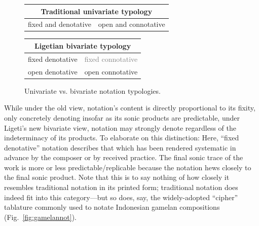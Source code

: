 \begin{figure}
    \centering
            \begin{tabular}{ |c|c| }
             \hline
             \multicolumn{2}{|c|}{\textbf{Traditional univariate typology}} \\
             \hline
             fixed and denotative & open and connotative  \\ 
             \hline
            \end{tabular}

                \vspace{10pt}

            \begin{tabular}{ |c|c| }
             \hline
             \multicolumn{2}{|c|}{\textbf{Ligetian bivariate typology}} \\
             \hline
             fixed denotative & \textcolor{gray}{fixed connotative\footnotemark}  \\ 
             \hline
             open denotative & open connotative  \\     
             \hline
            \end{tabular}
    \caption{Univariate vs. bivariate notation typologies.}
        \label{fig:typologies}
    \end{figure}

    While under the old view, notation's content is directly proportional to its fixity, only concretely denoting insofar as its sonic products are predictable, under Ligeti's new bivariate view, notation may strongly denote regardless of the indeterminacy of its products. To elaborate on this distinction: Here, ``fixed denotative'' notation describes that which has been rendered systematic in advance by the composer or by received practice. The final sonic trace of the work is more or less predictable/replicable because the notation hews closely to the final sonic product. Note that this is to say nothing of how closely it resembles traditional notation in its printed form; traditional notation does indeed fit into this category---but so does, say, the widely-adopted ``cipher'' tablature commonly used to notate Indonesian gamelan compositions (Fig.~\ref{fig:gamelannot}).

